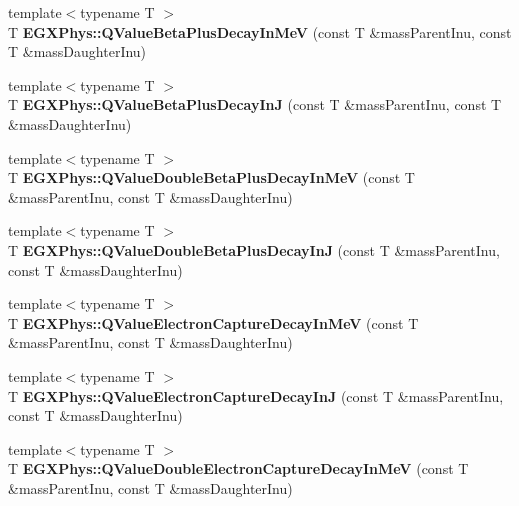 \begin{DoxyCompactItemize}
{\footnotesize template$<$typename T $>$ }\\T {\bfseries E\+G\+X\+Phys\+::\+Q\+Value\+Beta\+Plus\+Decay\+In\+MeV} (const T \&mass\+Parent\+Inu, const T \&mass\+Daughter\+Inu)
\item 
\mbox{\label{group___q_value_ga066fe9a9816a204c801c557a85bc60df}} 
{\footnotesize template$<$typename T $>$ }\\T {\bfseries E\+G\+X\+Phys\+::\+Q\+Value\+Beta\+Plus\+Decay\+InJ} (const T \&mass\+Parent\+Inu, const T \&mass\+Daughter\+Inu)
\item 
\mbox{\label{group___q_value_ga3fb4b374bc1df69b96a66d0488bb2ba1}} 
{\footnotesize template$<$typename T $>$ }\\T {\bfseries E\+G\+X\+Phys\+::\+Q\+Value\+Double\+Beta\+Plus\+Decay\+In\+MeV} (const T \&mass\+Parent\+Inu, const T \&mass\+Daughter\+Inu)
\item 
\mbox{\label{group___q_value_ga7d8dcc2691c2d4de9132e758e149ba51}} 
{\footnotesize template$<$typename T $>$ }\\T {\bfseries E\+G\+X\+Phys\+::\+Q\+Value\+Double\+Beta\+Plus\+Decay\+InJ} (const T \&mass\+Parent\+Inu, const T \&mass\+Daughter\+Inu)
\item 
\mbox{\label{group___q_value_ga9a6b76207e2ec60fd0ee3511582f9e26}} 
{\footnotesize template$<$typename T $>$ }\\T {\bfseries E\+G\+X\+Phys\+::\+Q\+Value\+Electron\+Capture\+Decay\+In\+MeV} (const T \&mass\+Parent\+Inu, const T \&mass\+Daughter\+Inu)
\item 
\mbox{\label{group___q_value_ga7b523a7d197beb91dcda75ddde12c851}} 
{\footnotesize template$<$typename T $>$ }\\T {\bfseries E\+G\+X\+Phys\+::\+Q\+Value\+Electron\+Capture\+Decay\+InJ} (const T \&mass\+Parent\+Inu, const T \&mass\+Daughter\+Inu)
\item 
\mbox{\label{group___q_value_ga93e5774784c0d9551e46ba19e1dbc9ab}} 
{\footnotesize template$<$typename T $>$ }\\T {\bfseries E\+G\+X\+Phys\+::\+Q\+Value\+Double\+Electron\+Capture\+Decay\+In\+MeV} (const T \&mass\+Parent\+Inu, const T \&mass\+Daughter\+Inu)

\end{DoxyCompactItemize}
